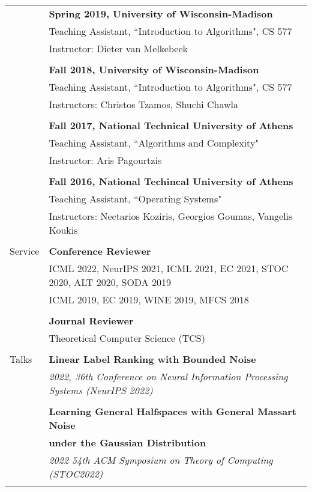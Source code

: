 \documentclass[letterpaper,11pt,oneside]{article}
\begin{document}
\begin{longtable}{@{} l l}
& \textbf{Spring 2019, University of Wisconsin-Madison} \\
& Teaching Assistant, ``Introduction to Algorithms", CS 577 \\
& Instructor: Dieter van Melkebeek \\
& \\

&\textbf{Fall 2018, University of Wisconsin-Madison} \\
& Teaching Assistant, ``Introduction to Algorithms", CS 577 \\
& Instructors: Christos Tzamos, Shuchi Chawla \\
& \\

&\textbf{Fall 2017, National Technical University of Athens} \\
& Teaching Assistant, ``Algorithms and Complexity" \\
& Instructor: Aris Pagourtzis \\
& \\

&\textbf{Fall 2016, National Techincal University of Athens} \\
& Teaching Assistant, ``Operating Systems" \\
& Instructors: Nectarios Koziris, Georgios Goumas, Vangelis Koukis\\
& \\

  \Large{Service} &\textbf{Conference Reviewer}\\

    & ICML 2022, NeurIPS 2021, ICML 2021, EC 2021, STOC 2020, ALT 2020, SODA 2019 \\ 
    & ICML 2019, EC 2019, WINE 2019, MFCS 2018 \\
    &\\

    &\textbf{Journal Reviewer}\\
    & Theoretical Computer Science (TCS)\\
    & \\

 \Large{Talks}
 &\textbf{Linear Label Ranking with Bounded Noise}\\ 
& \emph{2022, 36th Conference on Neural Information Processing Systems (NeurIPS 2022)} \\
 & \\

 &\textbf{Learning General Halfspaces with General Massart Noise}\\
 & \textbf{under the Gaussian Distribution}\\
 & \emph{2022 54th ACM Symposium on Theory of Computing (STOC2022)}\\
 & \\


\end{longtable}
\end{document}
